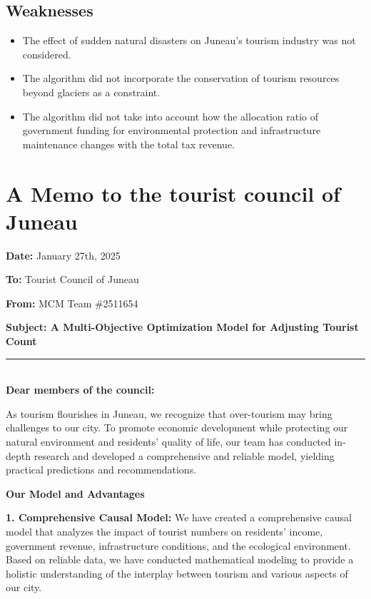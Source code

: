 \documentclass[12pt]{article}  %
\begin{document}
 \subsection{Weaknesses}

 \begin{itemize}
    \setlength{\parsep}{0ex} %
     \setlength{\topsep}{2ex} %
     \setlength{\itemsep}{1ex} %
      \item The effect of sudden natural disasters on Juneau's tourism industry was not considered.
      \item The algorithm did not incorporate the conservation of tourism resources beyond glaciers as a constraint.
      \item The algorithm did not take into account how the allocation ratio of government funding for environmental protection and infrastructure maintenance changes with the total tax revenue.
 \end{itemize}
 
 
 \clearpage
 \section{A Memo to the tourist council of Juneau}
 \noindent
 \textbf{Date:} January 27th, 2025

 \noindent
 \textbf{To:} Tourist Council of Juneau

 \noindent
 \textbf{From:} MCM Team \#2511654

 \noindent
 \textbf{Subject: A Multi-Objective Optimization Model for Adjusting Tourist Count}
 {\noindent}	 \rule[-0pt]{16.5cm}{0.15em}\\
\noindent
\textbf{Dear members of the council:}

As tourism flourishes in Juneau, we recognize that over-tourism may bring challenges to our city. To promote economic development while protecting our natural environment and residents' quality of life, our team has conducted in-depth research and developed a comprehensive and reliable model, yielding practical predictions and recommendations.

\noindent
\textbf{Our Model and Advantages}

\textbf{1. Comprehensive Causal Model:} We have created a comprehensive causal model that analyzes the impact of tourist numbers on residents' income, government revenue, infrastructure conditions, and the ecological environment. Based on reliable data, we have conducted mathematical modeling to provide a holistic understanding of the interplay between tourism and various aspects of our city.
\end{document}
